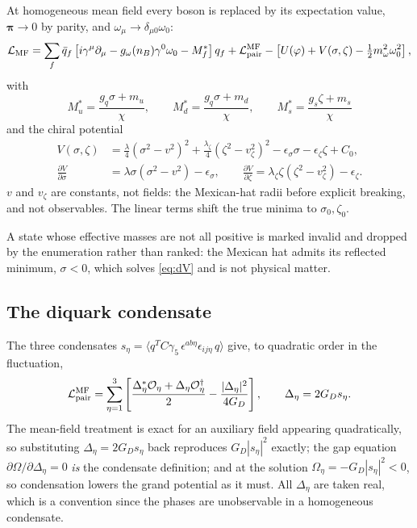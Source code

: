 \documentclass[11pt,a4paper]{article}
\newcommand{\Mstar}{M^{*}}
\begin{document}
At homogeneous mean field every boson is replaced by its expectation value,
$\bm\pi\to0$ by parity, and $\omega_\mu\to\delta_{\mu0}\omega_0$:
\begin{equation}
\mathcal L_{\rm MF} = \sum_f \bar q_f\left[i\gamma^\mu\partial_\mu
 - g_\omega(n_B)\gamma^0\omega_0 - \Mstar_f\right]q_f
 + \mathcal L^{\rm MF}_{\rm pair}
 - \left[U(\varphi)+V(\sigma,\zeta) - \tfrac12 m_\omega^2\omega_0^2\right],
\end{equation}
with
\begin{equation}
\boxed{\;
\Mstar_u = \frac{g_q\sigma+m_u}{\chi},\qquad
\Mstar_d = \frac{g_q\sigma+m_d}{\chi},\qquad
\Mstar_s = \frac{g_s\zeta+m_s}{\chi}\;}
\label{eq:masses}
\end{equation}
and the chiral potential
\begin{align}
V(\sigma,\zeta) &= \frac{\lambda}{4}\left(\sigma^2-v^2\right)^2
 + \frac{\lambda_\zeta}{4}\left(\zeta^2-v_\zeta^2\right)^2
 - \epsilon_\sigma\sigma - \epsilon_\zeta\zeta + C_0,
\label{eq:V}\\
\frac{\partial V}{\partial\sigma} &= \lambda\sigma(\sigma^2-v^2)-\epsilon_\sigma,
\qquad
\frac{\partial V}{\partial\zeta} = \lambda_\zeta\zeta(\zeta^2-v_\zeta^2)-\epsilon_\zeta .
\label{eq:dV}
\end{align}
$v$ and $v_\zeta$ are constants, not fields: the Mexican-hat radii before
explicit breaking, and not observables. The linear terms shift the true minima
to $\sigma_0,\zeta_0$.

A state whose effective masses are not all positive is marked invalid and
dropped by the enumeration rather than ranked: the Mexican hat admits its
reflected minimum, $\sigma<0$, which solves \eqref{eq:dV} and is not physical
matter.

\subsection{The diquark condensate}

The three condensates
$s_\eta = \langle q^{T}C\gamma_5\,\epsilon^{ab\eta}\epsilon_{ij\eta}\,q\rangle$
give, to quadratic order in the fluctuation,
\begin{equation}
\mathcal L^{\rm MF}_{\rm pair} = \sum_{\eta=1}^{3}
 \left[\frac{\Delta_\eta^*\mathcal O_\eta + \Delta_\eta\mathcal O_\eta^\dagger}{2}
 - \frac{|\Delta_\eta|^2}{4G_D}\right],
\qquad
\Delta_\eta = 2G_D s_\eta .
\end{equation}
The mean-field treatment is exact for an auxiliary field appearing
quadratically, so substituting $\Delta_\eta=2G_Ds_\eta$ back reproduces
$G_D|s_\eta|^2$ exactly; the gap equation
$\partial\Omega/\partial\Delta_\eta=0$ \emph{is} the condensate definition; and
at the solution $\Omega_\eta=-G_D|s_\eta|^2<0$, so condensation lowers the
grand potential as it must. All $\Delta_\eta$ are taken real, which is a
convention since the phases are unobservable in a homogeneous condensate.
\end{document}
